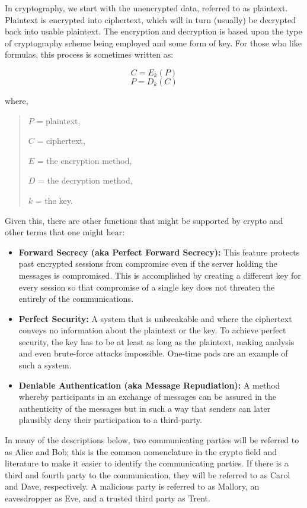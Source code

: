 \documentclass[british]{report}
\begin{document}
In cryptography, we start with the unencrypted data, referred to as
plaintext. Plaintext is encrypted into ciphertext, which will in turn
(usually) be decrypted back into usable plaintext. The encryption
and decryption is based upon the type of cryptography scheme being
employed and some form of key. For those who like formulas, this process
is sometimes written as:

\[
	C=E_{k}(P)
\]
\[
	P=D_{k}(C)
\]

where,
\begin{verse}
	$P$ = plaintext,

	$C$ = ciphertext,

	$E$ = the encryption method,

	$D$ = the decryption method,

	$k$ = the key.
\end{verse}
Given this, there are other functions that might be supported by crypto
and other terms that one might hear:
\begin{itemize}
	\item \textbf{Forward Secrecy (aka Perfect Forward Secrecy):} This feature
	      protects past encrypted sessions from compromise even if the server
	      holding the messages is compromised. This is accomplished by creating
	      a different key for every session so that compromise of a single key
	      does not threaten the entirely of the communications.
	\item \textbf{Perfect Security: }A system that is unbreakable and where
	      the ciphertext conveys no information about the plaintext or the key.
	      To achieve perfect security, the key has to be at least as long as
	      the plaintext, making analysis and even brute-force attacks impossible.
	      One-time pads are an example of such a system.
	\item \textbf{Deniable Authentication (aka Message Repudiation): }A method
	      whereby participants in an exchange of messages can be assured in
	      the authenticity of the messages but in such a way that senders can
	      later plausibly deny their participation to a third-party.
\end{itemize}
In many of the descriptions below, two communicating parties will
be referred to as Alice and Bob; this is the common nomenclature in
the crypto field and literature to make it easier to identify the
communicating parties. If there is a third and fourth party to the
communication, they will be referred to as Carol and Dave, respectively.
A malicious party is referred to as Mallory, an eavesdropper as Eve,
and a trusted third party as Trent.
\end{document}
